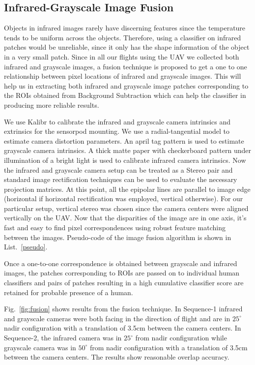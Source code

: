 \documentclass[runningheads]{llncs}
\begin{document}
\subsection{Infrared-Grayscale Image Fusion} 

Objects in infrared images rarely have discerning features since the temperature tends to be uniform across the objects. Therefore, using a classifier on infrared patches would be unreliable, since it only has the shape information of the object in a very small patch. Since in all our flights using the UAV we collected both infrared and grayscale images, a fusion technique is proposed to get a one to one relationship between pixel locations of infrared and grayscale images. This will help us in extracting both infrared and grayscale image patches corresponding to the ROIs obtained from Background Subtraction which can help the classifier in producing more reliable results.

We use Kalibr \cite{furgale2013unified} to calibrate the infrared and grayscale camera intrinsics and extrinsics for the sensorpod mounting. We use a radial-tangential model to estimate camera distortion parameters. An april tag pattern is used to estimate grayscale camera intrinsics. A thick matte paper with checkerboard pattern under illumination of a bright light is used to calibrate infrared camera intrinsics. Now the infrared and grayscale camera setup can be treated as a Stereo pair and standard image rectification techniques \cite{planar_rect} can be used to evaluate the necessary projection matrices. At this point, all the epipolar lines are parallel to image edge (horizontal if horizontal rectification was employed, vertical otherwise). For our particular setup, vertical stereo was chosen since the camera centers were aligned vertically on the UAV. Now that the disparities of the image are in one axis, it's fast and easy to find pixel correspondences using robust feature matching between the images. Pseudo-code of the image fusion algorithm is shown in List.~\ref{pseudo}.

Once a one-to-one correspondence is obtained between grayscale and infrared images, the patches corresponding to ROIs are passed on to individual human classifiers and pairs of patches resulting in a high cumulative classifier score are retained for probable presence of a human.


Fig.~\ref{fig:fusion} shows results from the fusion technique. In Sequence-1 infrared and grayscale cameras were both facing in the direction of flight and are in $25^{\circ}$ nadir configuration with a translation of 3.5cm between the camera centers. In Sequence-2, the infrared camera was in $25^{\circ}$ from nadir configuration while grayscale camera was in $50^{\circ}$ from nadir configuration with a translation of 3.5cm between the camera centers. The results show reasonable overlap accuracy.
\end{document}
